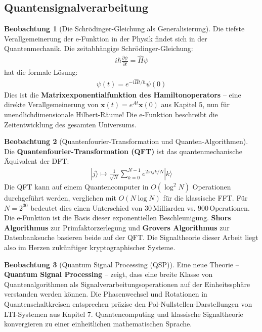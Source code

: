 ﻿\documentclass[a4paper,12pt]{report}
\theoremstyle{definition}
\newtheorem{beobachtung}{Beobachtung}
\begin{document}
	\subsection{Quantensignalverarbeitung}
	
	\begin{beobachtung}[Die Schrödinger-Gleichung als Generalisierung]
		Die tiefste Verallgemeinerung der e-Funktion in der Physik findet sich in der Quantenmechanik. Die zeitabhängige Schrödinger-Gleichung:
		\begin{align}
			i\hbar \frac{\partial \psi}{\partial t} = \hat{H} \psi
		\end{align}
		hat die formale Lösung:
		\begin{align}
			\psi(t) = e^{-i\hat{H}t/\hbar} \psi(0)
		\end{align}
		Dies ist die \textbf{Matrixexponentialfunktion des Hamiltonoperators} -- eine direkte Verallgemeinerung von $\mathbf{x}(t) = e^{At}\mathbf{x}(0)$ aus Kapitel 5, nun für unendlichdimensionale Hilbert-Räume! Die e-Funktion beschreibt die Zeitentwicklung des gesamten Universums.
	\end{beobachtung}
	
	\begin{beobachtung}[Quantenfourier-Transformation und Quanten-Algorithmen]
		Die \textbf{Quan\-tenfourier-Transformation (QFT)} ist das quantenmechanische Äquivalent der DFT:
		\begin{align}
			|j\rangle \mapsto \frac{1}{\sqrt{N}} \sum_{k=0}^{N-1} e^{2\pi i jk/N} |k\rangle
		\end{align}
		Die QFT kann auf einem Quantencomputer in $O(\log^2 N)$ Operationen durchgeführt werden, verglichen mit $O(N \log N)$ für die klassische FFT. Für $N = 2^{30}$ bedeutet dies einen Unterschied von $30\,\text{Milliarden}$ vs. $900\,\text{Operationen}$. Die e-Funktion ist die Basis dieser exponentiellen Beschleunigung. \textbf{Shors Algorithmus} zur Primfaktorzerlegung und \textbf{Grovers Algorithmus} zur Datenbanksuche basieren beide auf der QFT. Die Signaltheorie dieser Arbeit liegt also im Herzen zukünftiger kryptographischer Systeme.
	\end{beobachtung}
	
	\begin{beobachtung}[Quantum Signal Processing (QSP)]
		Eine neue Theorie -- \textbf{Quantum Signal Processing} -- zeigt, dass eine breite Klasse von Quantenalgorithmen als Signalverarbeitungsoperationen auf der Einheitssphäre verstanden werden können. Die Phasenwechsel und Rotationen in Quantenschaltkreisen entsprechen präzise den Pol-Nullstellen-Darstellungen von LTI-Systemen aus Kapitel 7. Quantencomputing und klassische Signaltheorie konvergieren zu einer einheitlichen mathematischen Sprache.
	\end{beobachtung}
	
\end{document}
